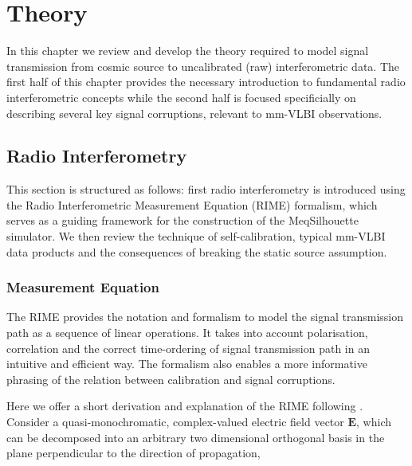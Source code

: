 \chapter{Theory}\label{chap:theory}
In this chapter we review and develop the theory required to model signal transmission from cosmic source to uncalibrated (raw) interferometric data. The first half of this chapter provides the necessary introduction to fundamental radio interferometric concepts while the second half is focused specificially on describing several key signal corruptions, relevant to mm-VLBI observations. 

\section{Radio Interferometry}\label{sec:radio_int}

This section is structured as follows: first radio interferometry is introduced using the Radio Interferometric Measurement Equation (RIME) formalism, which serves as a guiding framework for the construction of the {\sc MeqSilhouette} simulator. We then review the technique of self-calibration, typical mm-VLBI data products and the consequences of breaking the static source assumption.

\subsection{Measurement Equation}\label{sec:RIME}

The RIME provides the notation and formalism to model the signal transmission path as a sequence of linear operations. It takes into account polarisation, correlation and the correct time-ordering of signal transmission path in an intuitive and efficient way. The formalism also enables a more informative phrasing of the relation between calibration and signal corruptions.


Here we offer a short derivation and explanation of the RIME following \citet{Smirnov_2011a}. Consider a quasi-monochromatic, complex-valued electric field vector $\bm{E}$, which can be decomposed into an arbitrary two dimensional orthogonal basis in the plane perpendicular to the direction of propagation,

